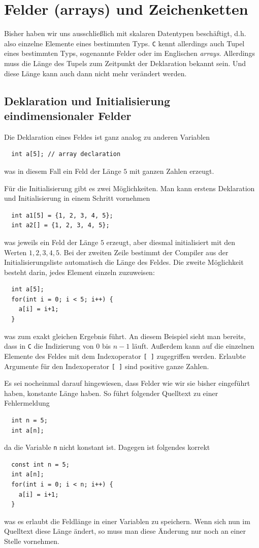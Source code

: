 \section{Felder (arrays) und Zeichenketten}

Bisher haben wir uns ausschließlich mit skalaren Datentypen beschäftigt, d.h. also einzelne Elemente eines bestimmten Typs.
\texttt{C} kennt allerdings auch Tupel eines bestimmten Typs, sogenannte Felder oder im Englischen \emph{arrays}.
Allerdings muss die Länge des Tupels zum Zeitpunkt der Deklaration bekannt sein.
Und diese Länge kann auch dann nicht mehr verändert werden.

\subsection{Deklaration und Initialisierung eindimensionaler Felder}

Die Deklaration eines Feldes ist ganz analog zu anderen Variablen
\begin{lstlisting}
  int a[5]; // array declaration
\end{lstlisting}
was in diesem Fall ein Feld der Länge $5$ mit ganzen Zahlen erzeugt.

Für die Initialisierung gibt es zwei Möglichkeiten.
Man kann erstens Deklaration und Initialisierung in einem Schritt vornehmen
\begin{lstlisting}
  int a1[5] = {1, 2, 3, 4, 5};
  int a2[] = {1, 2, 3, 4, 5};
\end{lstlisting}
was jeweils ein Feld der Länge $5$ erzeugt, aber diesmal initialisiert mit den Werten $1,2,3,4,5$.
Bei der zweiten Zeile bestimmt der Compiler aus der Initialisierungsliste automatisch die Länge des Feldes.
Die zweite Möglichkeit besteht darin, jedes Element einzeln zuzuweisen:
\begin{lstlisting}
  int a[5];
  for(int i = 0; i < 5; i++) {
    a[i] = i+1;
  }
\end{lstlisting}
was zum exakt gleichen Ergebnis führt.
An diesem Beispiel sieht man bereits, dass in \texttt{C} die Indizierung von $0$ bis $n-1$ läuft.
Außerdem kann auf die einzelnen Elemente des Feldes mit dem Indexoperator \verb|[ ]| zugegriffen werden.
Erlaubte Argumente für den Indexoperator \verb|[ ]| sind positive ganze Zahlen.\index{\texttt{[ ]}}

Es sei nocheinmal darauf hingewiesen, dass Felder wie wir sie bisher eingeführt haben, konstante Länge haben.
So führt folgender Quelltext zu einer Fehlermeldung
\begin{lstlisting}
  int n = 5;
  int a[n];
\end{lstlisting}
da die Variable \texttt{n} nicht konstant ist.
Dagegen ist folgendes korrekt
\begin{lstlisting}
  const int n = 5;
  int a[n];
  for(int i = 0; i < n; i++) {
    a[i] = i+1;
  }
\end{lstlisting}
was es erlaubt die Feldlänge in einer Variablen zu speichern.
Wenn sich nun im Quelltext diese Länge ändert, so muss man diese Änderung nur noch an einer Stelle vornehmen.


